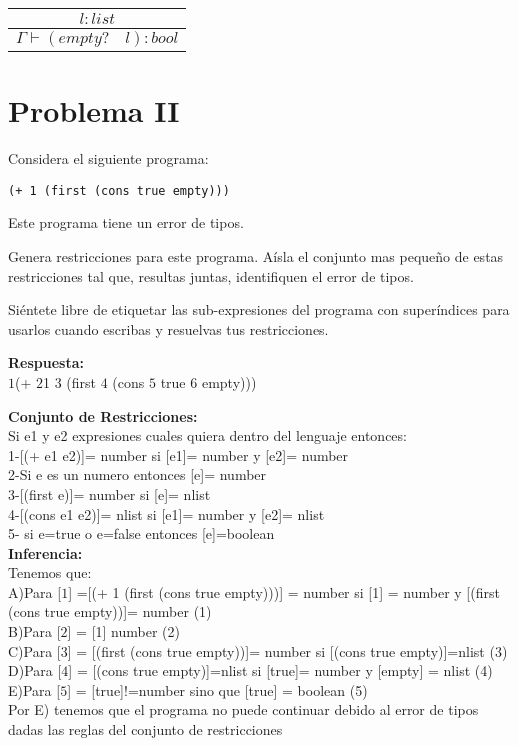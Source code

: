 \documentclass{article}
\begin{document}
\begin{center}
 \begin{longtable}{c}
 $l:list$ \\ \hline
 $\Gamma \vdash (empty? \quad l):bool$ \\
\end{longtable}

\end{center}

\section*{Problema II}
Considera el siguiente programa:

\begin{verbatim}
(+ 1 (first (cons true empty)))
\end{verbatim}

Este programa tiene un error de tipos.

Genera restricciones para este programa. Aísla el conjunto mas pequeño de
estas restricciones tal que, resultas juntas, identifiquen el error de tipos.

Siéntete libre de etiquetar las sub-expresiones del programa con superíndices
para usarlos cuando escribas y resuelvas tus restricciones.

\textbf {Respuesta: }
\\
$\boxed{1}$(+ $\boxed{2}$1  $\boxed{3}$ (first $\boxed{4}$ (cons $\boxed{5}$ true $\boxed{6}$ empty)))

\textbf {Conjunto de Restricciones: }
\\
Si e1 y e2 expresiones cuales quiera dentro del lenguaje entonces:
 \\
 1-[(+ e1 e2)]= number si [e1]= number y [e2]= number
 \\
 2-Si e es un numero entonces [e]= number
 \\
 3-[(first e)]= number si [e]= nlist
 \\
 4-[(cons e1 e2)]= nlist si [e1]= number y [e2]= nlist
 \\
 5- si e=true o e=false entonces [e]=boolean 
 \\
\textbf{Inferencia: }
  \\
  Tenemos que: 
  \\
  A)Para [$\boxed{1}$] =[(+ 1 (first (cons true empty)))] = number si [1] = number y [(first (cons true empty))]= number (1)\\ 
  B)Para [$\boxed{2}$] = [1] number (2)\\
  C)Para [$\boxed{3}$] = [(first (cons true empty))]= number si [(cons true empty)]=nlist (3)\\
  D)Para [$\boxed{4}$] = [(cons true empty)]=nlist si [true]= number y [empty] = nlist (4)\\
  E)Para [$\boxed{5}$] = [true]!=number sino que [true] = boolean (5)\\
  Por E) tenemos que el programa no puede continuar debido al error de tipos dadas las reglas del conjunto de restricciones
    
\end{document}
